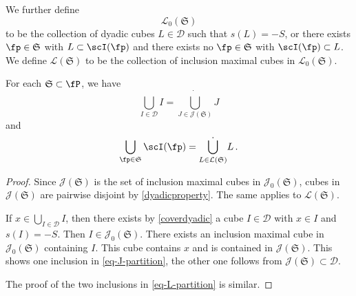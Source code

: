 We further define
$$
    \mathcal{L}_0(\mathfrak{S})
$$
to be the collection of dyadic cubes $L \in \mathcal{D}$ such that $s(L) = -S$, or there exists $\fp \in \mathfrak{S}$ with $L \subset \scI(\fp)$ and there exists no $\fp \in \mathfrak{S}$ with $\scI(\fp) \subset L$. We define $\mathcal{L}(\mathfrak{S})$ to be the collection of inclusion maximal cubes in $\mathcal{L}_0(\mathfrak{S})$.

\begin{lemma}
    \label{dyadic-partitions}
    \leanok
    For each $\mathfrak{S} \subset \fP$, we have
    \begin{equation}
        \label{eq-J-partition}
        \bigcup_{I \in \mathcal{D}} I = \dot{\bigcup_{J \in \mathcal{J}(\mathfrak{S})}} J
    \end{equation}
    and
    \begin{equation}
        \label{eq-L-partition}
        \bigcup_{\fp\in \mathfrak{S}} \scI(\fp) = \dot{\bigcup_{L \in \mathcal{L}(\mathfrak{S})}} L\,.
    \end{equation}
\end{lemma}

\begin{proof}
    \leanok
    Since $\mathcal{J}(\mathfrak{S})$ is the set of inclusion maximal cubes in $\mathcal{J}_0(\mathfrak{S})$, cubes in $\mathcal{J}(\mathfrak{S})$ are pairwise disjoint by \eqref{dyadicproperty}. The same applies to $\mathcal{L}(\mathfrak{S})$.

    If $x \in \bigcup_{I \in \mathcal{D}} I$, then there exists by \eqref{coverdyadic} a cube $I \in \mathcal{D}$ with $x \in I$ and $s(I) = -S$. Then $I \in \mathcal{J}_0(\mathfrak{S})$. There exists an inclusion maximal cube in $\mathcal{J}_0(\mathfrak{S})$ containing $I$. This cube contains $x$ and is contained in $\mathcal{J}(\mathfrak{S})$. This shows one inclusion in \eqref{eq-J-partition}, the other one follows from $\mathcal{J}(\mathfrak{S}) \subset \mathcal{D}$.

    The proof of the two inclusions in \eqref{eq-L-partition} is similar.
\end{proof}

